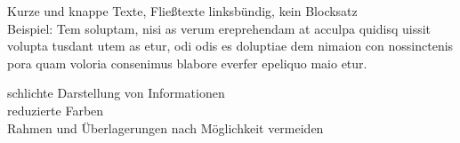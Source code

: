 \clearpage


\begin{frame}
 
Kurze und knappe Texte, Fließtexte linksbündig, kein Blocksatz \\[\baselineskip]

Beispiel:\newline
Tem soluptam, nisi as verum ereprehendam at acculpa quidisq uissit volupta
tusdant utem as etur, odi odis es doluptiae dem nimaion con nossinctenis pora
quam voloria consenimus blabore everfer epeliquo maio etur.

\end{frame}
\clearpage




\begin{frame}
    
schlichte Darstellung von Informationen \\[\baselineskip]

reduzierte Farben \\[\baselineskip]

Rahmen und Überlagerungen nach Möglichkeit vermeiden \\[\baselineskip]

    
\end{frame}
\clearpage


